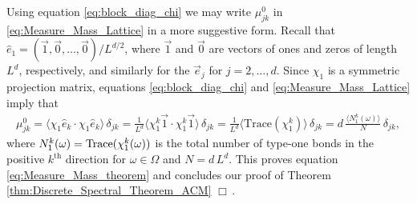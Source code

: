 \documentclass{cmslatex}
\begin{document}
Using equation \eqref{eq:block_diag_chi} we may write
$\mu^0_{jk}$ in \eqref{eq:Measure_Mass_Lattice} in a more suggestive
form. Recall that $\hat{e}_1=(\vec{1},\vec{0},\ldots,\vec{0})/L^{d/2}$,
where $\vec{1}$ and $\vec{0}$ are vectors of ones and zeros of length
$L^d$, respectively, and similarly for the $\vec{e}_j$ for
$j=2,\ldots,d$. Since $\chi_1$ is a symmetric projection matrix, equations 
\eqref{eq:block_diag_chi} and \eqref{eq:Measure_Mass_Lattice} imply
that 
%
\begin{align}\label{eq:Measure_Mass_Lattice_Trace}
  \mu^0_{jk}%
       =\langle\chi_1\hat{e}_k\cdot\chi_1\hat{e}_k\rangle\,\delta_{jk}
       =\frac{1}{L^d}\langle\chi_1^k\vec{1}\cdot \chi_1^k\vec{1}\rangle\,\delta_{jk}
       =\frac{1}{L^d}\langle\text{Trace}(\chi_1^k)\rangle\,\delta_{jk}
       =d\,\frac{\langle N_1^k(\omega)\rangle}{N}\,\delta_{jk},       
\end{align}
%
where $N_1^k(\omega)={\rm Trace}(\chi_1^k(\omega))$ is the total number of type-one
bonds in the positive $k^{\text{th}}$ direction for $\omega\in\Omega$ and
$N=d\,L^d$. This proves equation \eqref{eq:Measure_Mass_theorem} and
concludes our proof of Theorem \ref{thm:Discrete_Spectral_Theorem_ACM}
$\Box\,$.       
\end{document}
